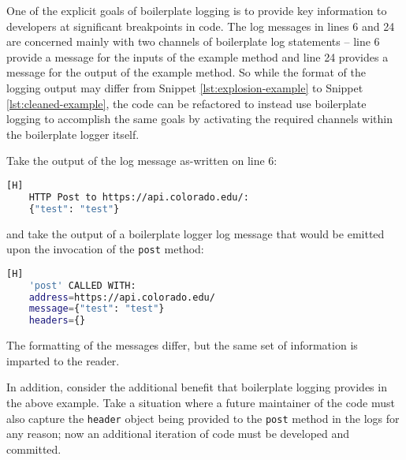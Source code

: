 \documentclass[acmsmall,review,authorversion]{acmart}
\begin{document}
    One of the explicit goals of boilerplate logging is to provide key information to developers at significant breakpoints in code. The log messages in lines 6 and 24 are concerned mainly with two channels of boilerplate log statements -- line 6 provide a message for the inputs of the example method and line 24 provides a message for the output of the example method. So while the format of the logging output may differ from Snippet \ref{lst:explosion-example} to Snippet \ref{lst:cleaned-example}, the code can be refactored to instead use boilerplate logging to accomplish the same goals by activating the required channels within the boilerplate logger itself.
    
    Take the output of the log message as-written on line 6:

    \begin{lstlisting}[language=bash][H]
    HTTP Post to https://api.colorado.edu/:
    {"test": "test"}
    \end{lstlisting}

    and take the output of a boilerplate logger log message that would be emitted upon the invocation of the \lstinline{post} method:

    \begin{lstlisting}[language=bash][H]
    'post' CALLED WITH: 
    address=https://api.colorado.edu/
    message={"test": "test"}
    headers={}
    \end{lstlisting}
    
    The formatting of the messages differ, but the same set of information is imparted to the reader. 
    
    In addition, consider the additional benefit that boilerplate logging provides in the above example. Take a situation where a future maintainer of the code must also capture the \lstinline{header} object being provided to the \lstinline{post} method in the logs for any reason; now an additional iteration of code must be developed and committed.
    
\end{document}
